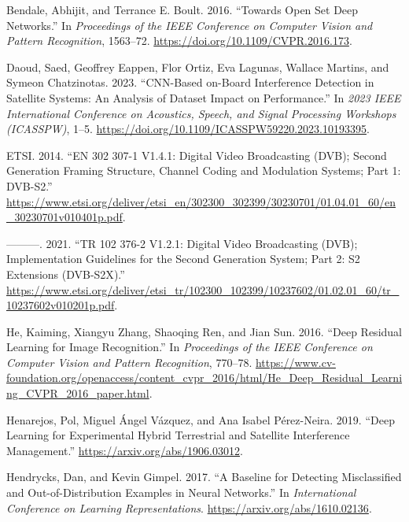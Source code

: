 \documentclass[
  10pt,
]{article}
\newlength{\cslhangindent}
\newenvironment{CSLReferences}[2] %
 {\begin{list}{}{%
  \setlength{\itemindent}{0pt}
  \setlength{\leftmargin}{0pt}
  \setlength{\parsep}{0pt}
  \ifodd #1
   \setlength{\leftmargin}{\cslhangindent}
   \setlength{\itemindent}{-1\cslhangindent}
  \fi
  \setlength{\itemsep}{#2\baselineskip}}}
 {\end{list}}
\begin{document}
\label{refs}
\begin{CSLReferences}{1}{0}
Bendale, Abhijit, and Terrance E. Boult. 2016. {``Towards Open Set Deep
Networks.''} In \emph{Proceedings of the IEEE Conference on Computer
Vision and Pattern Recognition}, 1563--72.
\url{https://doi.org/10.1109/CVPR.2016.173}.

Daoud, Saed, Geoffrey Eappen, Flor Ortiz, Eva Lagunas, Wallace Martins,
and Symeon Chatzinotas. 2023. {``{CNN}-Based on-Board Interference
Detection in Satellite Systems: An Analysis of Dataset Impact on
Performance.''} In \emph{2023 IEEE International Conference on
Acoustics, Speech, and Signal Processing Workshops (ICASSPW)}, 1--5.
\url{https://doi.org/10.1109/ICASSPW59220.2023.10193395}.

ETSI. 2014. {``{EN 302 307-1 V1.4.1}: Digital Video Broadcasting
({DVB}); Second Generation Framing Structure, Channel Coding and
Modulation Systems; Part 1: {DVB-S2}.''}
\url{https://www.etsi.org/deliver/etsi_en/302300_302399/30230701/01.04.01_60/en_30230701v010401p.pdf}.

---------. 2021. {``{TR 102 376-2 V1.2.1}: Digital Video Broadcasting
({DVB}); Implementation Guidelines for the Second Generation System;
Part 2: {S2} Extensions ({DVB-S2X}).''}
\url{https://www.etsi.org/deliver/etsi_tr/102300_102399/10237602/01.02.01_60/tr_10237602v010201p.pdf}.

He, Kaiming, Xiangyu Zhang, Shaoqing Ren, and Jian Sun. 2016. {``Deep
Residual Learning for Image Recognition.''} In \emph{Proceedings of the
IEEE Conference on Computer Vision and Pattern Recognition}, 770--78.
\url{https://www.cv-foundation.org/openaccess/content_cvpr_2016/html/He_Deep_Residual_Learning_CVPR_2016_paper.html}.

Henarejos, Pol, Miguel Ángel Vázquez, and Ana Isabel Pérez-Neira. 2019.
{``Deep Learning for Experimental Hybrid Terrestrial and Satellite
Interference Management.''} \url{https://arxiv.org/abs/1906.03012}.

Hendrycks, Dan, and Kevin Gimpel. 2017. {``A Baseline for Detecting
Misclassified and Out-of-Distribution Examples in Neural Networks.''} In
\emph{International Conference on Learning Representations}.
\url{https://arxiv.org/abs/1610.02136}.


\end{CSLReferences}
\end{document}

